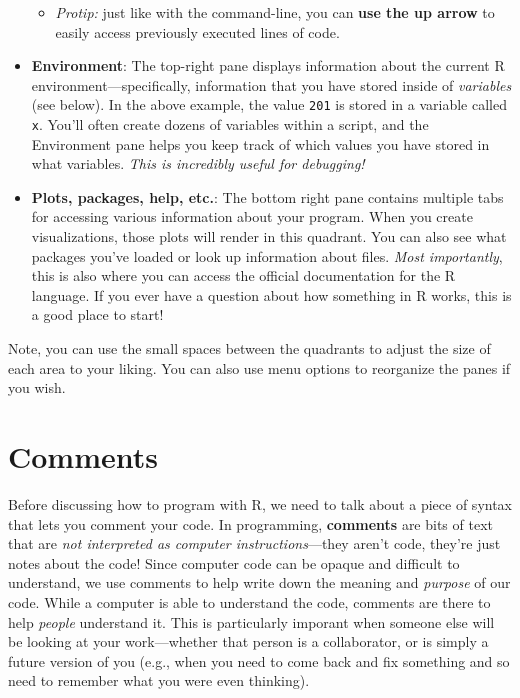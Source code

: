 \documentclass[]{book}
\providecommand{\tightlist}{%
  \setlength{\itemsep}{0pt}\setlength{\parskip}{0pt}}
\theoremstyle{definition}
\theoremstyle{definition}
\theoremstyle{remark}
\begin{document}
\begin{itemize}
  \begin{itemize}
  \tightlist
  \item
    \emph{Protip:} just like with the command-line, you can \textbf{use
    the up arrow} to easily access previously executed lines of code.
  \end{itemize}
\item
  \textbf{Environment}: The top-right pane displays information about
  the current R environment---specifically, information that you have
  stored inside of \emph{variables} (see below). In the above example,
  the value \texttt{201} is stored in a variable called \texttt{x}.
  You'll often create dozens of variables within a script, and the
  Environment pane helps you keep track of which values you have stored
  in what variables. \emph{This is incredibly useful for debugging!}
\item
  \textbf{Plots, packages, help, etc.}: The bottom right pane contains
  multiple tabs for accessing various information about your program.
  When you create visualizations, those plots will render in this
  quadrant. You can also see what packages you've loaded or look up
  information about files. \emph{Most importantly}, this is also where
  you can access the official documentation for the R language. If you
  ever have a question about how something in R works, this is a good
  place to start!
\end{itemize}

Note, you can use the small spaces between the quadrants to adjust the
size of each area to your liking. You can also use menu options to
reorganize the panes if you wish.

\section{Comments}\label{comments}

Before discussing how to program with R, we need to talk about a piece
of syntax that lets you comment your code. In programming,
\textbf{comments} are bits of text that are \emph{not interpreted as
computer instructions}---they aren't code, they're just notes about the
code! Since computer code can be opaque and difficult to understand, we
use comments to help write down the meaning and \emph{purpose} of our
code. While a computer is able to understand the code, comments are
there to help \emph{people} understand it. This is particularly imporant
when someone else will be looking at your work---whether that person is
a collaborator, or is simply a future version of you (e.g., when you
need to come back and fix something and so need to remember what you
were even thinking).
\end{document}
